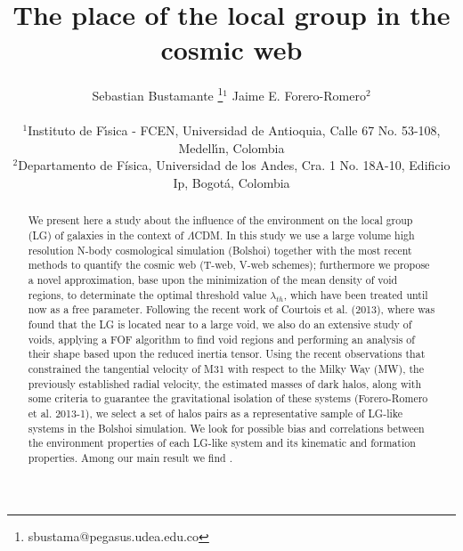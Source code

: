 \documentclass[usenatbib]{latex/mn2e}
\begin{document}
\title{The place of the local group in the cosmic web}
\author[S. Bustamante and J.E. Forero-Romero]{
\parbox[t]{\textwidth}{\raggedright 
  Sebastian Bustamante \thanks{sbustama@pegasus.udea.edu.co}$^{1}$ 
  Jaime E. Forero-Romero$^{2}$ 
}
\vspace*{6pt}\\
$^1$Instituto de F\'{\i}sica - FCEN, Universidad de Antioquia, Calle
67 No. 53-108, Medell\'{\i}n, Colombia\\ 
$^2$Departamento de F\'{i}sica, Universidad de los Andes, Cra. 1
No. 18A-10, Edificio Ip, Bogot\'a, Colombia
}

\maketitle

\begin{abstract}


We present here a study about the influence of the environment on the
local group (LG) of galaxies in the context of $\Lambda$CDM. In this study 
we use a large volume high resolution N-body cosmological simulation 
(Bolshoi) together with the most recent methods to quantify the cosmic web 
(T-web, V-web schemes); furthermore we propose a novel approximation, base
upon the minimization of the mean density of void regions, to determinate 
the optimal threshold value $\lambda_{th}$, which have been treated until 
now as a free parameter. 
Following the recent work of Courtois et al. (2013), where was 
found that the LG is located near to a large void, we also do an extensive 
study of voids, applying a FOF algorithm to find void regions and 
performing an analysis of their shape based upon the reduced inertia 
tensor.
Using the recent observations that constrained the tangential velocity of
M31 with respect to the Milky Way (MW), the previously established radial 
velocity, the estimated masses of dark halos, along with some criteria
to guarantee the gravitational isolation of these systems (Forero-Romero
et al. 2013-1), we select a set of halos pairs as a representative sample 
of LG-like systems in the Bolshoi simulation. 
We look for possible bias and correlations between the environment 
properties of each LG-like system and its kinematic and formation properties. 
Among our main result we find .

\end{abstract}
\end{document}
